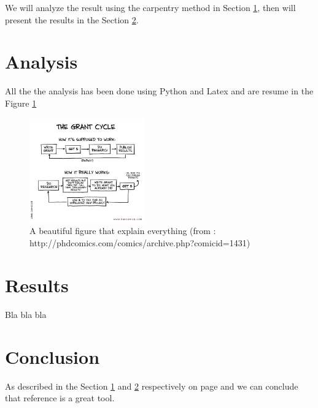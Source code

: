 \documentclass[a4paper]{article}
\begin{document}

\tableofcontents

\newpage

We will analyze the result using the carpentry method in Section \ref{sec:analysis}, then will present the results in the Section \ref{sec:results}.

\section{Analysis}\label{sec:analysis}

All the the analysis has been done using Python and Latex and are resume in the Figure \ref{fig:analysis}

\begin{figure}
\includegraphics[width=5cm]{fig/phd050611s}
\caption{A beautiful figure that explain everything (from : http://phdcomics.com/comics/archive.php?comicid=1431)}
\label{fig:analysis}
\end{figure}

\section{Results}\label{sec:results}

Bla bla bla

\section{Conclusion}\label{sec:conclusion}

As described in the Section \ref{sec:analysis} and \ref{sec:results} respectively on page \pageref{sec:analysis} and \pageref{sec:results} we can conclude that reference is a great tool.
\end{document}
